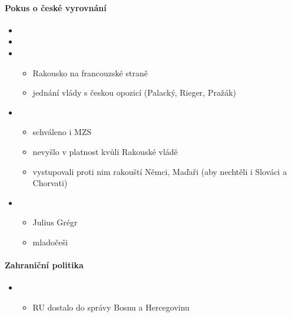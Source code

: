 \paragraph{Pokus o české vyrovnání}
\begin{itemize}
\item {}
\item {}
\item {}
	\begin{itemize}
	\item Rakousko na francouzské straně
	\item jednání vlády s českou opozicí (Palacký, Rieger, Pražák)
	\end{itemize}
\item {}
	\begin{itemize}
	\item schváleno i MZS
	\item nevyšlo v platnost kvůli Rakouské vládě
	\item vystupovali proti nim rakouští Němci, Maďaři (aby nechtěli i Slováci a Chorvati)
	\end{itemize}
\item {}
	\begin{itemize}
	\item Julius Grégr
	\item mladočeši
	\end{itemize}
\end{itemize}

\paragraph{Zahraniční politika}
\begin{itemize}
\item {}
	\begin{itemize}
	\item RU dostalo do správy Bosnu a Hercegovinu
	\end{itemize}
\end{itemize}

